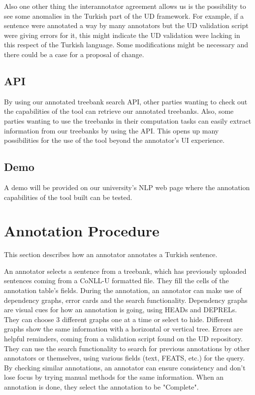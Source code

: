 \documentclass[
]{ceurart}
\begin{document}
Also one other thing the interannotator agreement allows us is the possibility to see some anomalies in the Turkish part of the UD framework.
For example, if a sentence were annotated a way by many annotators but the UD validation script were giving errors for it, this might indicate the UD validation were lacking in this respect of the Turkish language.
Some modifications might be necessary and there could be a case for a proposal of change.

\subsection{API}

By using our annotated treebank search API, other parties wanting to check out the capabilities of the tool can retrieve our annotated treebanks.
Also, some parties wanting to use the treebanks in their computation tasks can easily extract information from our treebanks by using the API.
This opens up many possibilities for the use of the tool beyond the annotator's UI experience.

\subsection{Demo}

A demo will be provided on our university's NLP web page where the annotation capabilities of the tool built can be tested.

\section{Annotation Procedure}
This section describes how an annotator annotates a Turkish sentence.

An annotator selects a sentence from a treebank, which has previously uploaded sentences coming from a CoNLL-U formatted file.
They fill the cells of the annotation table's fields.
During the annotation, an annotator can make use of dependency graphs, error cards and the search functionality.
Dependency graphs are visual cues for how an annotation is going, using HEADs and DEPRELs.
They can choose 3 different graphs one at a time or select to hide.
Different graphs show the same information with a horizontal or vertical tree.
Errors are helpful reminders, coming from a validation script found on the UD repository.
They can use the search functionality to search for previous annotations by other annotators or themselves, using various fields (text, FEATS, etc.) for the query.
By checking similar annotations, an annotator can ensure consistency and don't lose focus by trying manual methods for the same information.
When an annotation is done, they select the annotation to be "Complete".
\end{document}

